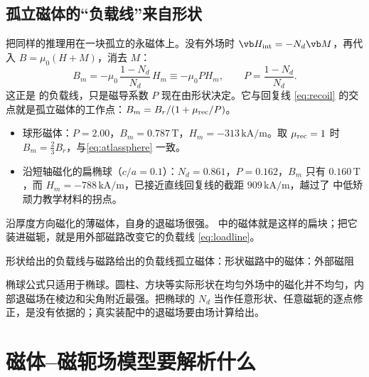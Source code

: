 \subsection{孤立磁体的“负载线”来自形状}
把同样的推理用在一块孤立的永磁体上。没有外场时 $\vb H_{\rm int}=-N_d\vb M$，再代入 $B=\mu_0(H+M)$，消去 $M$：
\begin{equation}
B_m=-\mu_0\,\frac{1-N_d}{N_d}\,H_m\equiv-\mu_0PH_m,\qquad P=\frac{1-N_d}{N_d}.
\label{eq:magnets-shapeload}
\end{equation}
这正是 的负载线，只是磁导系数 $P$ 现在由形状决定。它与回复线 \eqref{eq:recoil} 的交点就是孤立磁体的工作点：$B_m=B_r/(1+\mu_{\rm rec}/P)$。
\begin{itemize}
\item 球形磁体：$P=2.00$，$B_m=0.787\,\mathrm T$，$H_m=-313\,\mathrm{kA/m}$。取 $\mu_{\rm rec}=1$ 时 $B_m=\tfrac23B_r$，与\eqref{eq:atlassphere} 一致。
\item 沿短轴磁化的扁椭球（$c/a=0.1$）：$N_d=0.861$，$P=0.162$，$B_m$ 只有 $0.160\,\mathrm T$，而 $H_m=-788\,\mathrm{kA/m}$，已接近直线回复线的截距 $909\,\mathrm{kA/m}$，越过了 中低矫顽力教学材料的拐点。
\end{itemize}
沿厚度方向磁化的薄磁体，自身的退磁场很强。 中的磁体就是这样的扁块；把它装进磁轭，就是用外部磁路改变它的负载线 \eqref{eq:loadline}。

\begin{compare}{形状给出的负载线与磁路给出的负载线}{孤立磁体：形状}{磁路中的磁体：外部磁阻}
\end{compare}

椭球公式只适用于椭球。圆柱、方块等实际形状在均匀外场中的磁化并不均匀，内部退磁场在棱边和尖角附近最强。把椭球的 $N_d$ 当作任意形状、任意磁轭的逐点修正，是没有依据的；真实装配中的退磁场要由场计算给出。

\section{磁体--磁轭场模型要解析什么}\label{sec:magnets-fem}

